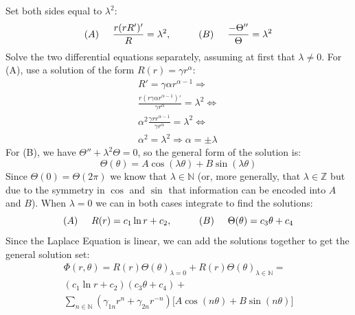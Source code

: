 \documentclass[aps,twocolumn,pre,nofootinbib,10pt]{revtex4-1}
\begin{document}
Set both sides equal to $\lambda^2$:
\[ (A) \hspace{0.5cm} \frac{r(rR')'}{R} = \lambda^2, \hspace{1cm} (B) \hspace{0.5cm} \frac{- \Theta''}{\Theta} = \lambda^2 \]
Solve the two differential equations separately, assuming at first that $\lambda \neq 0$. 
For (A), use a solution of the form $R(r) = \gamma r^\alpha$:
\begin{gather*}
 R' = \gamma \alpha r^{\alpha - 1} \Rightarrow \\
 \frac{r(r\gamma \alpha r^{\alpha - 1})'}{\gamma r^\alpha} = \lambda^2 \Leftrightarrow \\
 \alpha^2 \frac{\gamma r r^{\alpha - 1}}{\gamma r^\alpha} = \lambda^2 \Leftrightarrow \\
 \alpha^2 = \lambda^2 \Rightarrow \alpha = \pm \lambda 
\end{gather*}
For (B), we have $\Theta'' + \lambda^2 \Theta = 0$, so the general form of the solution is:
\[ \Theta(\theta) = A \cos(\lambda \theta) + B \sin(\lambda \theta) \]
Since $\Theta(0) = \Theta(2\pi)$ we know that $\lambda \in \mathbb{N}$ (or, more generally,
that $\lambda \in \mathbb{Z}$ but due to the symmetry in $\cos$ and $\sin$ that information can be encoded into $A$ and $B$).
When $\lambda = 0$ we can in both cases integrate to find the solutions:
\[ (A) \hspace{0.5cm} R(r) = c_1 \ln r + c_2,\hspace{1cm} (B)\hspace{0.5cm} \Theta(\theta) = c_3 \theta + c_4 \]
Since the Laplace Equation is linear, we can add the solutions together to get the general solution set:
\begin{gather*}
 \Phi(r, \theta) = R(r)\Theta(\theta)_{\lambda = 0} + R(r)\Theta(\theta)_{\lambda \in \mathbb{N}} = \\
 (c_1 \ln r + c_2)(c_3 \theta + c_4) + \\
\sum_{n \in \mathbb{N}} (\gamma_{1n} r^n + \gamma_{2n} r^{-n})
\big[A \cos(n \theta) + B \sin(n \theta) \big] 
\end{gather*}
\end{document}
